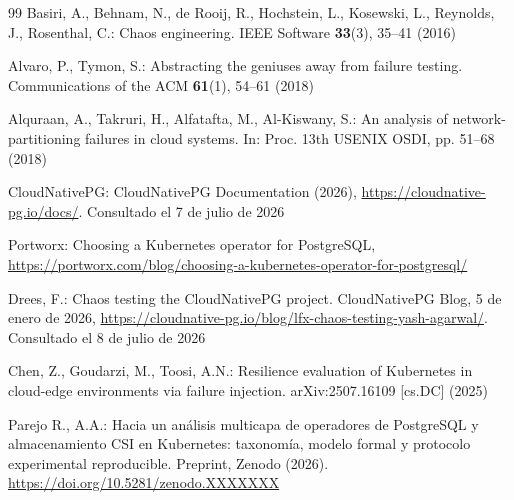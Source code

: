 \documentclass[a4paper]{llncs}
\begin{document}
\begin{thebibliography}{99}
Basiri, A., Behnam, N., de Rooij, R., Hochstein, L., Kosewski, L., Reynolds, J.,
Rosenthal, C.: Chaos engineering. IEEE Software \textbf{33}(3), 35--41 (2016)

Alvaro, P., Tymon, S.: Abstracting the geniuses away from failure testing.
Communications of the ACM \textbf{61}(1), 54--61 (2018)

Alquraan, A., Takruri, H., Alfatafta, M., Al-Kiswany, S.: An analysis of
network-partitioning failures in cloud systems. In: Proc. 13th USENIX OSDI, pp.
51--68 (2018)

CloudNativePG: CloudNativePG Documentation (2026),
\url{https://cloudnative-pg.io/docs/}. Consultado el 7 de julio de 2026

Portworx: Choosing a Kubernetes operator for PostgreSQL,
\url{https://portworx.com/blog/choosing-a-kubernetes-operator-for-postgresql/}

Drees, F.: Chaos testing the CloudNativePG project. CloudNativePG Blog, 5 de
enero de 2026, \url{https://cloudnative-pg.io/blog/lfx-chaos-testing-yash-agarwal/}.
Consultado el 8 de julio de 2026

Chen, Z., Goudarzi, M., Toosi, A.N.: Resilience evaluation of Kubernetes in
cloud-edge environments via failure injection. arXiv:2507.16109 [cs.DC] (2025)

Parejo R., A.A.: Hacia un análisis multicapa de operadores de PostgreSQL y
almacenamiento CSI en Kubernetes: taxonomía, modelo formal y protocolo
experimental reproducible. Preprint, Zenodo (2026).
\url{https://doi.org/10.5281/zenodo.XXXXXXX}

\end{thebibliography}
\end{document}
